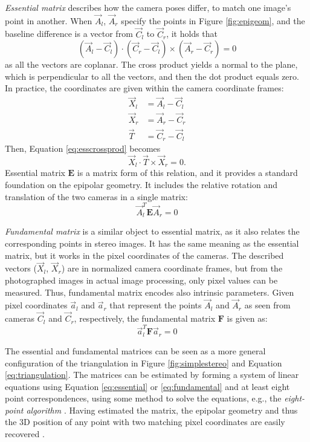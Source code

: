\emph{Essential matrix} \cite{hartley03multiview} describes how the camera poses differ, to match one image's point in another.
When $\vec A_l$, $\vec A_r$ specify the points in Figure \ref{fig:epigeom}, and the baseline difference is a vector from $\vec C_l$ to $\vec C_r$, it holds that
\begin{equation} \label{eq:esscrossprod}
	(\vec A_l-\vec C_l) \cdot (\vec C_r - \vec C_l) \times (\vec A_r-\vec C_r) = 0
\end{equation}
as all the vectors are coplanar.
The cross product yields a normal to the plane, which is perpendicular to all the vectors, and then the dot product equals zero.
In practice, the coordinates are given within the camera coordinate frames:
\begin{align*}
	\vec X_l &= \vec A_l - \vec C_l\\
	\vec X_r &= \vec A_r - \vec C_r\\
	\vec T &= \vec C_r - \vec C_l
\end{align*}
Then, Equation \ref{eq:esscrossprod} becomes
\begin{equation}
	\vec X_l \cdot \vec T \times \vec X_r = 0.
\end{equation}
Essential matrix $\bm E$ is a matrix form of this relation, and it provides a standard foundation on the epipolar geometry.
It includes the relative rotation and translation of the two cameras in a single matrix:
\begin{equation} \label{eq:essential}
	\vec A_l^T \bm E \vec A_r = 0
\end{equation}

\emph{Fundamental matrix} \cite[ch.~11]{hartley03multiview} is a similar object to essential matrix, as it also relates the corresponding points in stereo images.
It has the same meaning as the essential matrix, but it works in the pixel coordinates of the cameras.
The described vectors ($\vec X_l$, $\vec X_r$) are in normalized camera coordinate frames, but from the photographed images in actual image processing, only pixel values can be measured.
Thus, fundamental matrix encodes also intrinsic parameters.
Given pixel coordinates $\vec a_l$ and $\vec a_r$ that represent the points $\vec A_l$ and $\vec A_r$ as seen from cameras $\vec C_l$ and $\vec C_r$, respectively, the fundamental matrix $\bm F$ is given as:
\begin{equation} \label{eq:fundamental}
	\vec a_l^T \bm F \vec a_r = 0
\end{equation}

The essential and fundamental matrices can be seen as a more general configuration of the triangulation in Figure \ref{fig:simplestereo} and Equation \ref{eq:triangulation}.
The matrices can be estimated by forming a system of linear equations using Equation \ref{eq:essential} or \ref{eq:fundamental} and at least eight point correspondences, using some method to solve the equations, e.g., the \emph{eight-point algorithm} \cite[p.~155]{hartley03multiview}.
Having estimated the matrix, the epipolar geometry and thus the 3D position of any point with two matching pixel coordinates are easily recovered \cite[p.~162]{hartley03multiview}.

